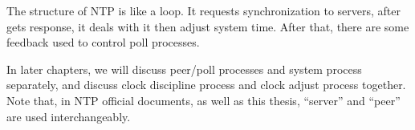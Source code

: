 

The structure of NTP is like a loop. It requests synchronization to servers,
after gets response, it deals with it then adjust system time. After that,
there are some feedback used to control poll processes.

In later chapters, we will discuss peer/poll processes and system process
separately, and discuss clock discipline process and clock adjust process
together. Note that, in NTP official documents, as well as this thesis,
``server'' and ``peer'' are used interchangeably.



